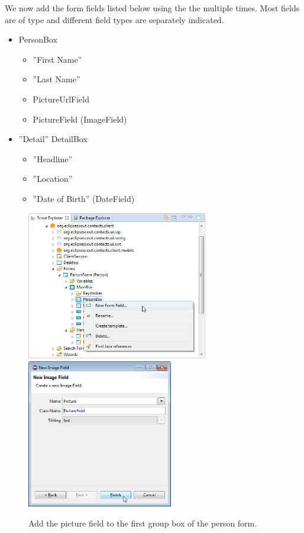 \documentclass[a4paper,10pt,twoside]{book}
\begin{document}
We now add the form fields listed below using the the  multiple times. 
Most fields are of type  and different field types are separately indicated. 

\begin{itemize}
  \item{PersonBox}
  \begin{itemize}
    \item ''First Name'' 
    \item ''Last Name''
    \item PictureUrlField
    \item PictureField (ImageField)
  \end{itemize} 
  \item{''Detail'' DetailBox}
  \begin{itemize}
    \item ''Headline'' 
    \item ''Location''
    \item ''Date of Birth'' (DateField)
  \end{itemize} 
\end{itemize} 

\begin{figure}
\includegraphics[height=6.5cm]{new_field_picture_contextmenu.png} \hspace{5mm}
\includegraphics[height=6.5cm]{new_field_picture.png}
\caption{Add the picture field to the first group box of the person form.}
\end{figure}
\end{document}
